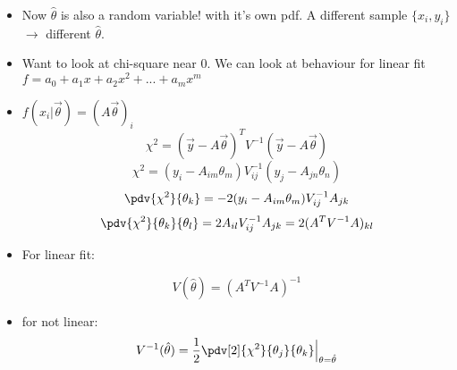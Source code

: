\begin{itemize}
      \item Now $\hat{\theta}$ is also a random variable! with it's own pdf. A different sample $\{x_i, y_i\}$ $\rightarrow$ different $\hat{\theta}$.
      \item Want to look at chi-square near 0. We can look at behaviour for linear fit $f = a_0 + a_1 x + a_2 x^2 + ... + a_m x^m$
      \item $f(x_i|\vec{\theta}) = (A \vec{\theta})_i$
            \[ \chi^2 = (\vec{y} - A \vec{\theta})^T V^{-1} (\vec{y} - A \vec{\theta}) \]
            \[ \chi^2 = (y_i - A_{im} \theta_m) V_{ij}^{-1} (y_j - A_{jn} \theta_n) \]
            \[ \pdv{\chi^2}{\theta_k} = -2 (y_i - A_{im} \theta_m) V_{ij}^{-1} A_{jk} \]
            \[ \pdv{\chi^2}{\theta_k}{\theta_l} =  2 A_{il} V_{ij}^{-1} A_{jk} = 2 (A^T V^{-1} A)_{kl}\]
      \item For linear fit:

            \[ V(\hat{\theta}) = (A^T V^{-1} A)^{-1} \]
      \item for not linear:
            \[ V^{-1}(\hat{\theta}) = \frac{1}{2} \pdv[2]{\chi^2}{\theta_j}{\theta_k} \Big|_{\theta = \hat{\theta}} \]
\end{itemize}
